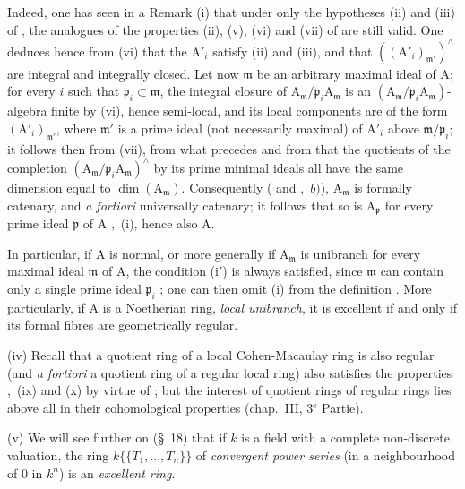 \begin{remarks}[7.8.4]
Indeed, one has seen in a Remark (i) that under only the hypotheses (ii) and (iii) of , the analogues of the properties (ii), (v), (vi) and (vii) of  are still valid. One deduces hence from (vi) that the $\mathrm{A}'_i$ satisfy (ii) and (iii), and that $((\mathrm{A}'_i)_{\mathfrak{m}'})^\wedge$ are integral and integrally closed. Let now $\mathfrak{m}$ be an arbitrary maximal ideal of $\mathrm{A}$; for every $i$ such that $\mathfrak{p}_i\subset\mathfrak{m}$, the integral closure of $\mathrm{A}_\mathfrak{m}/\mathfrak{p}_i\mathrm{A}_\mathfrak{m}$ is an $(\mathrm{A}_\mathfrak{m}/\mathfrak{p}_i\mathrm{A}_\mathfrak{m})$-algebra finite by (vi), hence semi-local, and its local components are of the form $(\mathrm{A}'_i)_{\mathfrak{m}'}$, where $\mathfrak{m}'$ is a prime ideal (not necessarily maximal) of $\mathrm{A}'_i$ above $\mathfrak{m}/\mathfrak{p}_i$; it follows then from (vii), from what precedes and from  that the quotients of the completion $(\mathrm{A}_\mathfrak{m}/\mathfrak{p}_i\mathrm{A}_\mathfrak{m})^\wedge$ by its prime minimal ideals all have the same dimension equal to $\dim(\mathrm{A}_\mathfrak{m})$. Consequently ( and ,~$b)$), $\mathrm{A}_\mathfrak{m}$ is formally catenary, and \emph{a fortiori}  universally catenary; it follows that so is $\mathrm{A}_\mathfrak{p}$ for every prime ideal $\mathfrak{p}$ of $\mathrm{A}$ ,~(i), hence also $\mathrm{A}$.

In particular, if $\mathrm{A}$ is normal, or more generally if $\mathrm{A}_\mathfrak{m}$ is unibranch for every maximal ideal $\mathfrak{m}$ of $\mathrm{A}$, the condition (i$'$) is always satisfied, since $\mathfrak{m}$ can contain only a single prime ideal $\mathfrak{p}_i$ ; one can then omit (i) from the definition . More particularly, if $\mathrm{A}$ is a Noetherian ring, \emph{local unibranch}, it is excellent if and only if its formal fibres are geometrically regular.

(iv) Recall that a quotient ring of a local Cohen-Macaulay ring is also regular (and \emph{a fortiori} a quotient ring of a regular local ring) also satisfies the properties ,~(ix) and (x) by virtue of ; but the interest of quotient rings of regular rings lies above all in their cohomological properties (chap.~III, 3${}^{\text{e}}$ Partie).

(v) We will see further on (\S~18) that if $k$ is a field with a complete non-discrete valuation, the ring $k\{\!\{T_1,\ldots,T_n\}\!\}$ of \emph{convergent power series} (in a neighbourhood of $0$ in $k^n$) is an \emph{excellent ring}.
\end{remarks}

